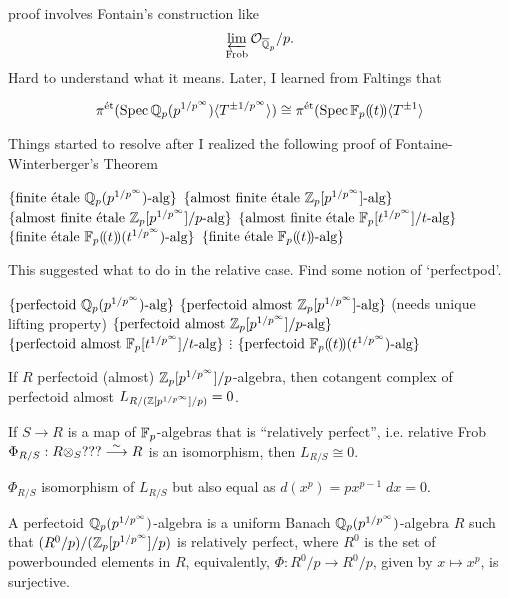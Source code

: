 proof involves Fontain's construction like
	\[
	\varprojlim_{\operatorname{Frob}} \mathcal{O}_{\overline{\mathbb{Q}}_p}/p. 
	\]
Hard to understand what it means. Later, I learned from Faltings that

\begin{thm}
	\[
	\pi^{\text{\'et}}(\operatorname{Spec} \mathbb{Q}_p(p^{1/p^\infty}) \langle T^{\pm1/p^\infty} \rangle) \cong \pi^{\text{\'et}}(\operatorname{Spec} \mathbb{F}_p(\!(t)\!) \langle T^{\pm 1} \rangle
	\]
\end{thm}


Things started to resolve after I realized the following proof of Fontaine-Winterberger's Theorem

$\{ \text{finite \'etale } \mathbb{Q}_p(p^{1/p^\infty})\text{-alg} \}$
$\{ \text{almost finite \'etale } \mathbb{Z}_p[p^{1/p^\infty}]\text{-alg} \}$
$\{ \text{almost finite \'etale } \mathbb{Z}_p[p^{1/p^\infty}]/p\text{-alg} \}$
$\{ \text{almost finite \'etale } \mathbb{F}_p[t^{1/p^\infty}]/t\text{-alg} \}$
$\{\text{finite \'etale } \mathbb{F}_p(\!(t)\!)(t^{1/p^\infty})\text{-alg} \}$
$\{\text{finite \'etale } \mathbb{F}_p(\!(t)\!)\text{-alg} \}$


This suggested what to do in the relative case. Find some notion of `perfectpod'. 

$\{ \text{perfectoid } \mathbb{Q}_p(p^{1/p^\infty})\text{-alg} \}$
$\{ \text{perfectoid almost } \mathbb{Z}_p[p^{1/p^\infty}]\text{-alg} \}$
(needs unique lifting property)
$\{ \text{perfectoid almost } \mathbb{Z}_p[p^{1/p^\infty}]/p\text{-alg} \}$
$\{ \text{perfectoid almost } \mathbb{F}_p[t^{1/p^\infty}]/t\text{-alg} \}$
$\vdots$
$\{ \text{perfectoid } \mathbb{F}_p(\!(t)\!)(t^{1/p^\infty})\text{-alg} \}$

If $R$ perfectoid (almost) $\mathbb{Z}_p[p^{1/p^\infty}]/p$-algebra, then cotangent complex of perfectoid almost $L_{R/(\mathbb{Z}[p^{1/p^\infty}]/p)}= 0$.


\begin{lem}
If $S \to R$ is a map of $\mathbb{F}_p$-algebras that is ``relatively perfect'', i.e. relative Frob $\Phi_{R/S}: R \otimes_S ??? \stackrel{\sim}{\longrightarrow} R$ is an isomorphism, then $L_{R/S} \cong 0$.
\end{lem}

\pfsk $\Phi_{R/S}$ isomorphism of $L_{R/S}$ but also equal as $d(x^p)= px^{p-1} \;dx=0$.


\begin{dfn}
A perfectoid $\mathbb{Q}_p(p^{1/p^\infty})$-algebra is a uniform Banach $\mathbb{Q}_p(p^{1/p^\infty})$-algebra $R$ such that $(R^0/p)/(\mathbb{Z}_p[p^{1/p^\infty}]/p)$ is relatively perfect, where $R^0$ is the set of powerbounded elements in $R$, equivalently, $\Phi: R^0/p \to R^0/p$, given by $x \mapsto x^p$, is surjective. 
\end{dfn}


